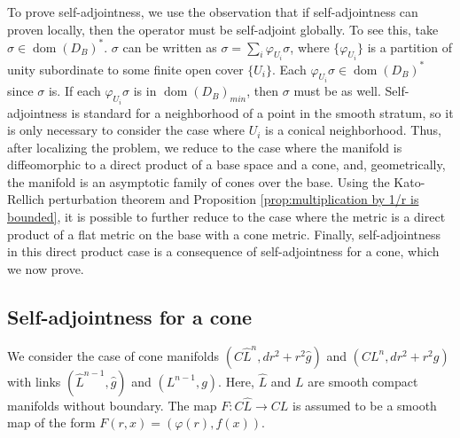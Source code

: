 \documentclass[12pt, reqno]{amsart}
\theoremstyle{plain} %
\theoremstyle{definition}
\theoremstyle{remark}
\numberwithin{equation}{section}
\newcommand{\dom}[1]{\hat{#1}}
\newcommand{\tdim}{n} %
\DeclareMathOperator{\operdom}{dom}
\begin{document}
To prove self-adjointness, we use the observation that if self-adjointness can proven locally, then the operator must be self-adjoint globally.
To see this, take \(\sigma \in \operdom(D_B)^*\). \(\sigma\) can be written as \(\sigma=\sum_i\varphi_{U_i}\sigma\), where \(\{\varphi_{U_i}\}\) is a partition of unity subordinate to some finite open cover \(\{U_i\}\).
Each \(\varphi_{U_i} \sigma \in \operdom (D_B)^*\) since \(\sigma\) is.
If each \(\varphi_{U_i} \sigma\) is in \(\operdom (D_B)_{min}\), then \(\sigma\) must be as well.
Self-adjointness is standard for a neighborhood of a point in the smooth stratum, so it is only necessary to consider the case where \(U_i\) is a conical neighborhood.
Thus, after localizing the problem, we reduce to the case where the manifold is diffeomorphic to a direct product of a base space and a cone, and, geometrically, the manifold is an asymptotic family of cones over the base.
Using the Kato-Rellich perturbation theorem and Proposition \ref{prop:multiplication by 1/r is bounded}, it is possible to further reduce to the case where the metric is a direct product of a flat metric on the base with a cone metric.
Finally, self-adjointness in this direct product case is a consequence of self-adjointness for a cone, which we now prove.

\subsection{Self-adjointness for a cone}\label{sec:self-adjointness over point}
We consider the case of cone manifolds \((C\dom{L}^{\tdim}, dr^2 + r^2 \dom{g})\) and \((CL^{\tdim}, dr^2 + r^2 g)\) with links \((\dom{L}^{\tdim-1}, \dom{g})\) and \((L^{\tdim - 1}, g)\).
Here, \(\dom{L}\) and \(L\) are smooth compact manifolds without boundary.
The map \(F \colon C\dom{L} \to CL\) is assumed to be a smooth map of the form \(F(r, x) = (\varphi(r), f(x))\).
\end{document}

